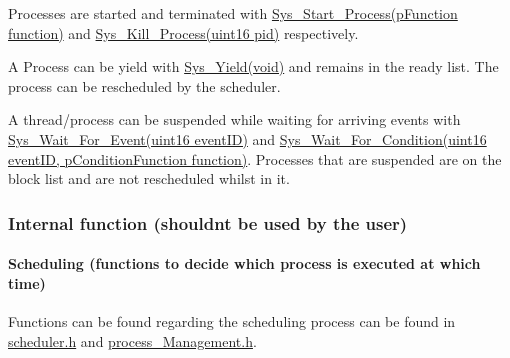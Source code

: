 \begin{DoxyEnumerate}
\item Processes are started and terminated with \hyperlink{process__Management_8h_a0833f904557c4c9b39b4cf5c1e43586f}{Sys\+\_\+\+Start\+\_\+\+Process(p\+Function function)} and \hyperlink{process__Management_8h_a724935e8f908ee565ff779e7ba5dfc67}{Sys\+\_\+\+Kill\+\_\+\+Process(uint16 pid)} respectively.
\item A Process can be yield with \hyperlink{process__Management_8h_afea22f7c15161f12a5b108b3795da332}{Sys\+\_\+\+Yield(void)} and remains in the ready list. The process can be rescheduled by the scheduler.
\item A thread/process can be suspended while waiting for arriving events with \hyperlink{process__Management_8h_a9f0893d1c6a5ffb1f954737fc3a8904f}{Sys\+\_\+\+Wait\+\_\+\+For\+\_\+\+Event(uint16 event\+I\+D)} and \hyperlink{process__Management_8h_a5730456418e6d0dd9392522ec8153aec}{Sys\+\_\+\+Wait\+\_\+\+For\+\_\+\+Condition(uint16 event\+I\+D, p\+Condition\+Function function)}. Processes that are suspended are on the block list and are not rescheduled whilst in it. 
\end{DoxyEnumerate}\hypertarget{group__process_process_internal}{}\subsubsection{Internal function (shouldn\textquotesingle{}t be used by the user)}\label{group__process_process_internal}
\hypertarget{group__process_process_scheduling}{}\paragraph{Scheduling (functions to decide which process is executed at which time)}\label{group__process_process_scheduling}
Functions can be found regarding the scheduling process can be found in \hyperlink{scheduler_8h}{scheduler.\+h} and \hyperlink{process__Management_8h}{process\+\_\+\+Management.\+h}.
